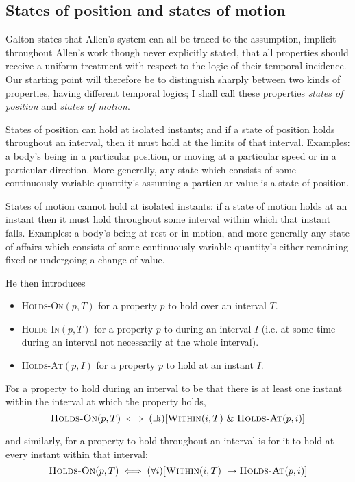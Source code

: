 \subsection{States of position and states of motion}
Galton states that Allen's system can all be traced to the assumption, implicit throughout Allen's
work though never explicitly stated, that all properties should receive a
uniform treatment with respect to the logic of their temporal incidence. Our
starting point will therefore be to distinguish sharply between two kinds of
properties, having different temporal logics; I shall call these properties \textit{states
	of position} and \textit{states of motion}.

States of position can hold at isolated instants; and if a state of position
holds throughout an interval, then it must hold at the limits of that interval.
Examples: a body's being in a particular position, or moving at a particular
speed or in a particular direction. More generally, any state which consists of
some continuously variable quantity's assuming a particular value is a state of
position.

States of motion cannot hold at isolated instants: if a state of motion holds
at an instant then it must hold throughout some interval within which that
instant falls. Examples: a body's being at rest or in motion, and more generally
any state of affairs which consists of some continuously variable quantity's
either remaining fixed or undergoing a change of value.

He then introduces
\begin{itemize}
	\item  \textsc{Holds-On}$(p, T)$ for a property $p$ to hold over an interval $T$.
	\item \textsc{Holds-In}$(p, T)$ for a property $p$ to during an interval $I$ (i.e. at some time during an interval not necessarily at the whole interval).
	\item \textsc{Holds-At}$(p, I)$ for a property $p$ to hold at an instant $I$.
\end{itemize}

For a property to hold during
an interval to be that there is at least one instant within the interval at which
the property holds,
\[
	\textsc{Holds-On}(p, T) \iff (\exists i)[\textsc{Within}(i, T) \  \& \ \textsc{Holds-At}(p, i)]
\]

and similarly, for a property to hold throughout an interval is for it to hold at
every instant within that interval:
\[
	\textsc{Holds-On}(p, T) \iff (\forall i)[\textsc{Within}(i, T) \  \to \textsc{Holds-At}(p, i)]
\]
